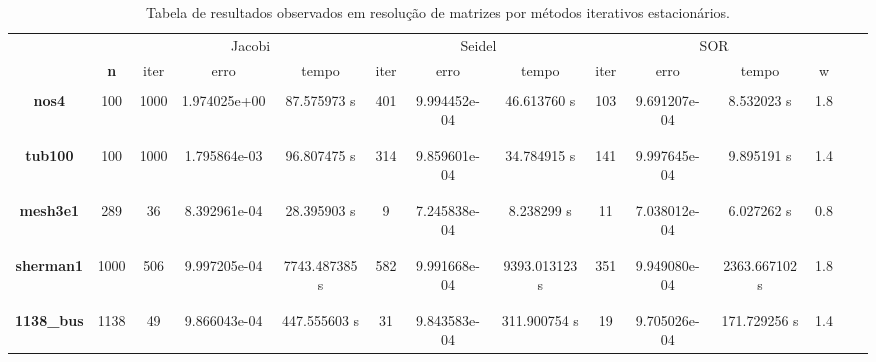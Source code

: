 \documentclass{article}
\begin{document}
\begin{table}[H]
    \centering
    \begin{tabular}{|c|c|c|c|c|c|c|c|c|c|c|c|c|c|}
        \hline \rowcolor{Gray}
          &  & \multicolumn{3}{c|}{Jacobi } & \multicolumn{3}{c|}{Seidel} & \multicolumn{4}{c|}{SOR} \\ \cline{3-12} \rowcolor{Gray}
         \multirow{-2}{*}{ \bfseries Nome} & \multirow{-2}{*}{\bfseries n} & iter & erro & tempo & iter & erro & tempo & iter & erro & tempo & w \\ 
         \hline & & & & & & & & & & &\\[-1em]
         \bfseries nos4 & 100 & 1000 & 1.974025e+00 & 87.575973 s & 401 & 9.994452e-04 & 46.613760 s & 103 & 9.691207e-04 & 8.532023 s & 1.8 \\ & & & & & & & & & & &\\ [-1em]
         \hline \\ [-1em]
         \bfseries tub100 & 100 & 1000 & 1.795864e-03 & 96.807475 s & 314 & 9.859601e-04 & 34.784915 s & 141 & 9.997645e-04 & 9.895191 s & 1.4 \\  & & & & & & & & & & &\\ [-1em]
         \hline \\ [-1em] 
         \bfseries mesh3e1 & 289 & 36 & 8.392961e-04 & 28.395903 s & 9 & 7.245838e-04 & 8.238299 s & 11 & 7.038012e-04 & 6.027262 s & 0.8\\  & & & & & & & & & & &\\ [-1em]
         \hline \\ [-1em] 
         \bfseries sherman1 & 1000 & 506 & 9.997205e-04 & 7743.487385 s & 582 & 9.991668e-04 & 9393.013123 s & 351 & 9.949080e-04 & 2363.667102 s & 1.8\\ & & & & & & & \\ [-1em]
         \hline \\ [-1em]
         \bfseries 1138\_bus & 1138 & 49 & 9.866043e-04 & 447.555603 s & 31 & 9.843583e-04 & 311.900754 s & 19 & 9.705026e-04 & 171.729256 s & 1.4
         \\ \hline
         
    \end{tabular}
    \caption{Tabela de resultados observados em resolução de matrizes por métodos iterativos estacionários.}
    \label{tab:iterativos}
\end{table}

\clearpage
\normalsetting
\end{document}
